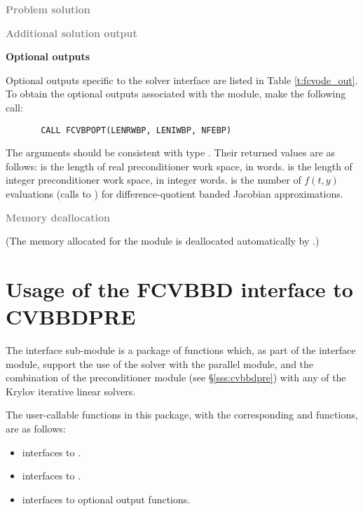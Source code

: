 \begin{Steps}
\item \textcolor{gray}{\bf Problem solution}
  
\item \textcolor{gray}{\bf Additional solution output}
  
\item {\bf {\cvbandpre} Optional outputs}
  
  Optional outputs specific to the {\cvls} solver interface are 
  listed in Table \ref{t:fcvode_out}.
  To obtain the optional outputs associated with the {\cvbandpre} module, make
  the following call:
\begin{verbatim}
       CALL FCVBPOPT(LENRWBP, LENIWBP, NFEBP)
\end{verbatim}
  The arguments should be consistent with {\CC} type .  Their
  returned values are as follows:
   is the length of real preconditioner work space, in 
  words.  is the length of integer preconditioner work space, in
  integer words.  is the number of $f(t,y)$ evaluations (calls to
  ) for difference-quotient banded Jacobian approximations.
  
\item \textcolor{gray}{\bf Memory deallocation}

  (The memory allocated for the {\fcvbp} module is deallocated automatically
  by .)

\end{Steps}


\section{Usage of the FCVBBD interface to CVBBDPRE}

The {\fcvbbd} interface sub-module is a package of {\CC} functions which,
as part of the {\fcvode} interface module, support the use of the
{\cvode} solver with the parallel {\nvecp} module, and the combination of
the {\cvbbdpre} preconditioner module (see \S\ref{sss:cvbbdpre}) with
any of the Krylov iterative linear solvers.

The user-callable functions in this package, with the corresponding
{\cvode} and {\cvbbdpre} functions, are as follows: 
\begin{itemize}
\item {}
  interfaces to .
\item {}
  interfaces to .
\item {}
  interfaces to {\cvbbdpre} optional output functions.
\end{itemize}

